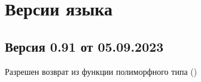 \hypertarget{versions}{%
\section{Версии языка}\label{versions:chapter}}

\hypertarget{v091}{%
\subsection{Версия 0.91 от 05.09.2023}\label{versions:v091}}

\begin{d_itemize}
\item Разрешен возврат из функции полиморфного типа  ()
\end{d_itemize}